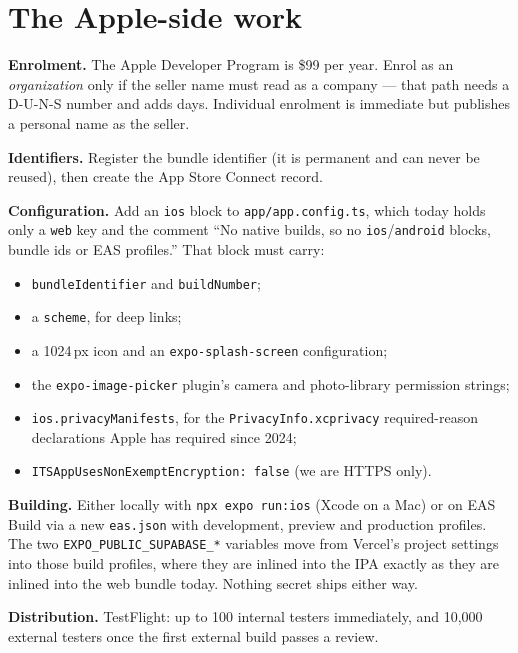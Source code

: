 \documentclass[11pt]{article}
\newcommand{\code}[1]{\texttt{\small #1}}
\newcommand{\bk}{\discretionary{}{}{}}
\begin{document}
\section{The Apple-side work}

\textbf{Enrolment.} The Apple Developer Program is \$99 per year. Enrol as an \emph{organization}
only if the seller name must read as a company --- that path needs a D-U-N-S number and adds days.
Individual enrolment is immediate but publishes a personal name as the seller.

\textbf{Identifiers.} Register the bundle identifier (it is permanent and can never be reused), then
create the App Store Connect record.

\textbf{Configuration.} Add an \code{ios} block to \code{app/app.config.ts}, which today holds only a
\code{web} key and the comment ``No native builds, so no \code{ios}/\code{android} blocks, bundle ids
or EAS profiles.'' That block must carry:

\begin{itemize}
  \item \code{bundleIdentifier} and \code{buildNumber};
  \item a \code{scheme}, for deep links;
  \item a 1024\,px icon and an \code{expo-splash-screen} configuration;
  \item the \code{expo-image-picker} plugin's camera and photo-library permission strings;
  \item \code{ios.privacyManifests}, for the \code{PrivacyInfo.\bk xcprivacy} required-reason
  declarations Apple has required since 2024;
  \item \code{ITSAppUses\bk NonExemptEncryption: false} (we are HTTPS only).
\end{itemize}

\textbf{Building.} Either locally with \code{npx expo run:ios} (Xcode on a Mac) or on EAS Build via a
new \code{eas.json} with development, preview and production profiles. The two
\code{EXPO\_\bk PUBLIC\_\bk SUPABASE\_*} variables move from Vercel's project settings into those
build profiles, where they are inlined into the IPA exactly as they are inlined into the web bundle
today. Nothing secret ships either way.

\textbf{Distribution.} TestFlight: up to 100 internal testers immediately, and 10{,}000 external
testers once the first external build passes a review.
\end{document}
